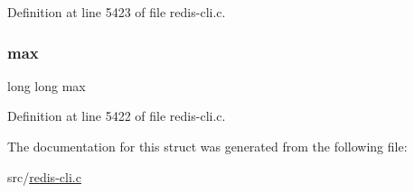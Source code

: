 Definition at line 5423 of file redis-\/cli.\+c.

\mbox{\label{structdistsamples_a3cc3af20c4a8a67e42db241f8e90472b}} 
\subsubsection{\texorpdfstring{max}{max}}
{\footnotesize\ttfamily long long max}



Definition at line 5422 of file redis-\/cli.\+c.



The documentation for this struct was generated from the following file\+:\begin{DoxyCompactItemize}
\item 
src/\hyperlink{redis-cli_8c}{redis-\/cli.\+c}\end{DoxyCompactItemize}
